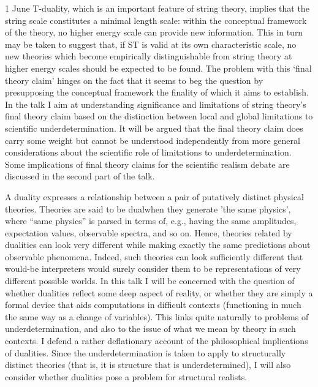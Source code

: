 \documentclass{conference}
\begin{document}
\begin{Day}{1 June}
    {T-duality, which is an important feature of string theory, implies that
the string scale constitutes a minimal length scale: within the conceptual
framework of the theory, no higher energy scale can provide new
information. This in turn may be taken to suggest that, if ST is valid at
its own characteristic scale, no new theories which become empirically
distinguishable from string theory at higher energy scales should be
expected to be found. The problem with this ‘final theory claim’ hinges on
the fact that it seems to beg the question by presupposing the conceptual
framework the finality of which it aims to establish. In the talk I aim at
understanding significance and limitations of string theory’s final theory
claim based on the distinction between local and global limitations to
scientific underdetermination. It will be argued that the final theory
claim does carry some weight but cannot be understood independently from
more general considerations about the scientific role of limitations to
underdetermination. Some implications of final theory claims for the
scientific realism debate are discussed in the second part of the talk.}

{A duality expresses a relationship between a pair of putatively distinct physical theories. Theories are said to be dualwhen they generate 'the same physics', where “same physics” is parsed in terms of, e.g., having the same amplitudes, expectation values, observable spectra, and so on. Hence, theories related by dualities can look very different while making exactly the same predictions about observable phenomena. Indeed, such theories can look sufficiently different that would-be interpreters would surely consider them to be representations of very different possible worlds. In this talk I will be concerned with the question of whether dualities reflect some deep aspect of reality, or whether they are simply a formal device that aids computations in difficult contexts (functioning in much the same way as a change of variables).  This links quite naturally to problems of underdetermination, and also to the issue of what we mean by theory in such contexts. I defend a rather deflationary account of the philosophical implications of dualities. Since the underdetermination is taken to apply to structurally distinct theories (that is, it is structure that is underdetermined), I will also consider whether dualities pose a problem for structural realists.}
\end{Day}

\pagebreak
\ListAbstracts
\end{document}
